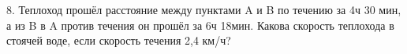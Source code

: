 8. Теплоход прошёл расстояние между пунктами A и B по течению за 4ч 30 мин, а из B в A против течения он прошёл за 6ч 18мин. Какова скорость теплохода в стоячей воде, если скорость течения 2,4 км/ч?\\
